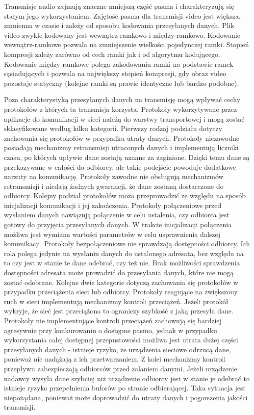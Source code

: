 Transmisje audio zajmują znaczne mniejszą część pasma i charakteryzują się stałym jego wykorzystaniem. Zajętość pasma dla transmisji video jest większa, zmnienna w czasie i zależy od sposobu kodowania przesyłanych danych. Plik video zwykle kodowany jest wewnątrz-ramkowo i między-ramkowo. Kodowanie wewnątrz-ramkowe pozwala na zmniejszenie wielkości pojedynczej ramki. Stopień kompresji zależy zarówno od cech ramki jak i od algorytmu kodującego. Kodowanie między-ramkowe polega zakodowaniu ramki na podstawie ramek sąsiadujących i pozwala na największy stopień kompresji, gdy obraz video pozostaje statyczny (kolejne ramki są prawie identyczne lub bardzo podobne).

Poza charakterystyką przesyłanych danych na transmisję mogą wpływać cechy protokołów z których ta transmisja korzysta. Protokoły wykorzytywane przez aplikacje do komunikacji w sieci należą do warstwy transportowej i mogą zostać sklasyfikowane według kilku kategorii. Pierwszy rodzaj podziału dotyczy zachowania się protokołów w przypadku utraty danych. Protokoły niezawodne posiadają mechanizmy retransmisji utraconych danych i implementują liczniki czasu, po których upływie dane zostają uznane za zaginione. Dzięki temu dane są przekazywane w całości do odbiorcy, ale takie podejście powoduje dodatkowe narzuty na komunikację. Protokoły zawodne nie obsługują mechanizmów retransmisji i niedają żadnych gwarancji, że dane zostaną dostarczone do odbiorcy. Kolejny podział protokołów moża przeprowadzić ze względu na sposób inicjalizacji komunikacji i jej zakończenia. Protokoły połączeniowe przed wysłaniem danych nawiązują połączenie w celu ustalenia, czy odbiorca jest gotowy do przyjęcia przesyłanych danych. W trakcie inicjalizacji połączenia możliwa jest wymiana wartości parametrów w celu usprawnienia dalszej komunikacji. Protokoły bezpołączeniowe nie sprawdzają dostępności odbiorcy. Ich rola polega jedynie na wysłaniu danych do ustalonego adresata, bez względu na to czy jest w stanie te dane odebrać, czy też nie. Brak możliwości sprawdzenia dostępności adresata może prowadzić do przesyłania danych, które nie mogą zostać odebrane. Kolejne dwie kategorie dotyczą zachowania się protokołów w przypadku przeciążenia sieci lub odbiorcy. Protokoły reagujące na zwiększony ruch w sieci implementują mechanizmy kontroli przeciążeń. Jeżeli protokół wykryje, że sieć jest przeciążona to ograniczy szybkość z jaką przesyła dane. Protokoły nie implementujące kontroli przeciążeń zachowują się bardziej agresywnie przy konkurowaniu o dostępne pasmo, jednak w przypadku wykorzystania całej dostępnej przepustowości możliwa jest utrata dużej części przesyłanych danych - istnieje ryzyko, że urządzenia sieciowe odrzucą dane, ponieważ nie nadążają z ich przetwarzaniem. Z kolei mechanizmy kontroli przepływu zabezpieczają odbiorców przed zalaniem danymi. Jeżeli urządzenie nadawcy wysyła dane szybciej niż urządzenie odbiorcy jest w stanie je odebrać to istnieje ryzyko przepełnienia buforów po stronie odbierającej. Taka sytuacja jest niepożądana, ponieważ może doprowadzić do utraty danych i pogorszenia jakości transmisji.


